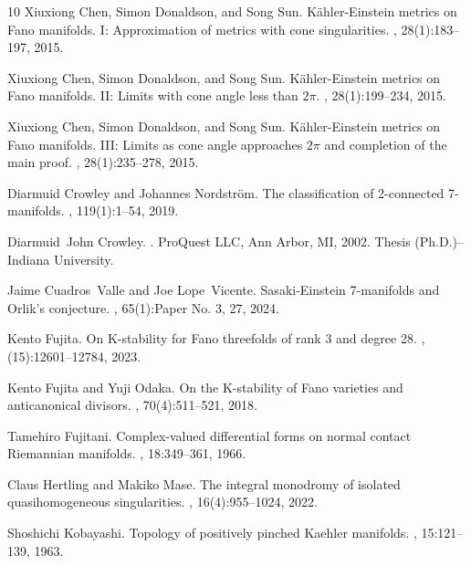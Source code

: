 \documentclass[12pt]{amsart}
\theoremstyle{definition}
\theoremstyle{remark}
\begin{document}
\begin{thebibliography}{10}
Xiuxiong Chen, Simon Donaldson, and Song Sun.
\newblock K\"ahler-{E}instein metrics on {F}ano manifolds. {I}: {A}pproximation
  of metrics with cone singularities.
, 28(1):183--197, 2015.

Xiuxiong Chen, Simon Donaldson, and Song Sun.
\newblock K\"ahler-{E}instein metrics on {F}ano manifolds. {II}: {L}imits with
  cone angle less than {$2\pi$}.
, 28(1):199--234, 2015.

Xiuxiong Chen, Simon Donaldson, and Song Sun.
\newblock K\"ahler-{E}instein metrics on {F}ano manifolds. {III}: {L}imits as
  cone angle approaches {$2\pi$} and completion of the main proof.
, 28(1):235--278, 2015.

Diarmuid Crowley and Johannes Nordstr\"om.
\newblock The classification of 2-connected 7-manifolds.
, 119(1):1--54, 2019.

Diarmuid~John Crowley.
.
\newblock ProQuest LLC, Ann Arbor, MI, 2002.
\newblock Thesis (Ph.D.)--Indiana University.

Jaime Cuadros~Valle and Joe Lope~Vicente.
\newblock Sasaki-{E}instein 7-manifolds and {O}rlik's conjecture.
, 65(1):Paper No. 3, 27, 2024.

Kento Fujita.
\newblock On {K}-stability for {F}ano threefolds of rank 3 and degree 28.
, (15):12601--12784, 2023.

Kento Fujita and Yuji Odaka.
\newblock On the {K}-stability of {F}ano varieties and anticanonical divisors.
, 70(4):511--521, 2018.

Tamehiro Fujitani.
\newblock Complex-valued differential forms on normal contact {R}iemannian
  manifolds.
, 18:349--361, 1966.

Claus Hertling and Makiko Mase.
\newblock The integral monodromy of isolated quasihomogeneous singularities.
, 16(4):955--1024, 2022.

Shoshichi Kobayashi.
\newblock Topology of positively pinched {K}aehler manifolds.
, 15:121--139, 1963.


\end{thebibliography}
\end{document}
